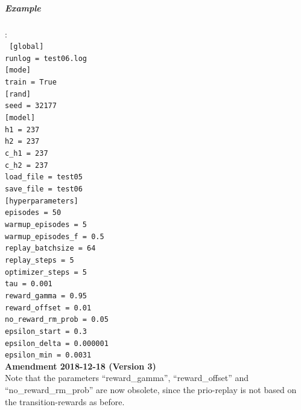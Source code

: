 \documentclass[a4paper]{article}
\begin{document}
\subparagraph{Example}
:\\
\tiny
\texttt{
{[global]} \\
runlog = test06.log \\
{[mode]} \\
train = True \\
{[rand]} \\
seed = 32177 \\
{[model]} \\
h1 = 237 \\
h2 = 237 \\
c\_h1 = 237 \\
c\_h2 = 237 \\
load\_file = test05 \\
save\_file = test06 \\
{[hyperparameters]} \\
episodes           = 50 \\
warmup\_episodes    = 5 \\
warmup\_episodes\_f  = 0.5 \\
replay\_batchsize   = 64 \\
replay\_steps       = 5 \\
optimizer\_steps    = 5 \\
tau                = 0.001 \\
reward\_gamma       = 0.95 \\
reward\_offset      = 0.01 \\
no\_reward\_rm\_prob  = 0.05 \\
epsilon\_start      = 0.3 \\
epsilon\_delta      = 0.000001 \\
epsilon\_min        = 0.0031
}
\\
\textbf{Amendment 2018-12-18 (Version 3)}\\
Note that the parameters \enquote{reward\_gamma}, \enquote{reward\_offset}
and \enquote{no\_reward\_rm\_prob} are now obsolete, since the prio-replay is not
based on the transition-rewards as before.

\normalsize
\end{document}
